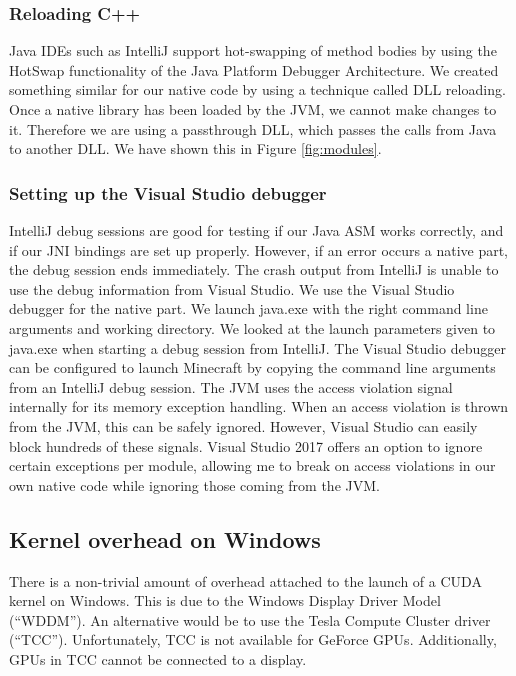 \documentclass[]{article}
\begin{document}
\subsubsection{Reloading C++}
Java IDEs such as IntelliJ support hot-swapping of method bodies by using the HotSwap functionality of the Java Platform Debugger Architecture.
We created something similar for our native code by using a technique called DLL reloading.
Once a native library has been loaded by the JVM, we cannot make changes to it.
Therefore we are using a passthrough DLL, which passes the calls from Java to another DLL.
We have shown this in Figure \ref{fig:modules}.

\subsubsection{Setting up the Visual Studio debugger}
IntelliJ debug sessions are good for testing if our Java ASM works correctly, and if our JNI bindings are set up properly.
However, if an error occurs a native part, the debug session ends immediately.
The crash output from IntelliJ is unable to use the debug information from Visual Studio.
We use the Visual Studio debugger for the native part.
We launch java.exe with the right command line arguments and working directory.
We looked at the launch parameters given to java.exe when starting a debug session from IntelliJ.
The Visual Studio debugger can be configured to launch Minecraft by copying the command line arguments from an IntelliJ debug session.
The JVM uses the access violation signal internally for its memory exception handling.
When an access violation is thrown from the JVM, this can be safely ignored.
However, Visual Studio can easily block hundreds of these signals.
Visual Studio 2017 offers an option to ignore certain exceptions per module, allowing me to break on access violations in our own native code while ignoring those coming from the JVM.

\subsection{Kernel overhead on Windows}
There is a non-trivial amount of overhead attached to the launch of a CUDA kernel on Windows.
This is due to the Windows Display Driver Model (\enquote{WDDM}).
An alternative would be to use the Tesla Compute Cluster driver (\enquote{TCC}).
Unfortunately, TCC is not available for GeForce GPUs.
Additionally, GPUs in TCC cannot be connected to a display.
\end{document}
